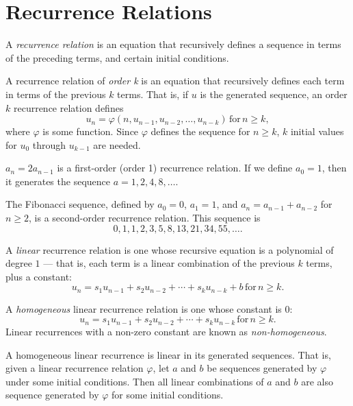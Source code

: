 \documentclass[12pt]{article}
\begin{document}
\section{Recurrence Relations}

\begin{defn}
    A \emph{recurrence relation} is an equation that recursively defines a sequence in terms of the preceding terms, and certain initial conditions.
\end{defn}

\begin{defn}
    A recurrence relation of \emph{order k} is an equation that recursively defines each term in terms of the previous $k$ terms. That is, if $u$ is the generated sequence, an order $k$ recurrence relation defines \[u_n = \varphi(n, u_{n-1}, u_{n-2}, \ldots, u_{n-k}) \,\textrm{for}\, n \geq k,\] where $\varphi$ is some function. Since $\varphi$ defines the sequence for $n \geq k$, $k$ initial values for $u_0$ through $u_{k-1}$ are needed.
\end{defn}

\begin{exmp}
    $a_n = 2a_{n-1}$ is a first-order (order 1) recurrence relation. If we define $a_0 = 1$, then it generates the sequence $a = 1, 2, 4, 8, \ldots$.
\end{exmp}

\begin{exmp}
    The Fibonacci sequence, defined by $a_0 = 0$, $a_1 = 1$, and $a_n = a_{n-1} + a_{n-2}$ for $n \geq 2$, is a second-order recurrence relation. This sequence is \[0, 1, 1, 2, 3, 5, 8, 13, 21, 34, 55, \ldots.\]
\end{exmp}

\begin{defn}
    A \emph{linear} recurrence relation is one whose recursive equation is a polynomial of degree $1$ --- that is, each term is a linear combination of the previous $k$ terms, plus a constant: \[u_n = s_1u_{n-1} + s_2u_{n-2} + \cdots + s_ku_{n-k} + b \,\textrm{for}\, n \geq k.\]
\end{defn}

\begin{defn}
    A \emph{homogeneous} linear recurrence relation is one whose constant is $0$: \[u_n = s_1u_{n-1} + s_2u_{n-2} + \cdots + s_ku_{n-k} \,\textrm{for}\, n \geq k.\] Linear recurrences with a non-zero constant are known as \emph{non-homogeneous}.
\end{defn}

\begin{prop}\label{linear-combinations-are-recurrence-solutions}
    A homogeneous linear recurrence is linear in its generated sequences. That is, given a linear recurrence relation $\varphi$, let $a$ and $b$ be sequences generated by $\varphi$ under some initial conditions. Then all linear combinations of $a$ and $b$ are also sequence generated by $\varphi$ for some initial conditions.
\end{prop}
\end{document}
